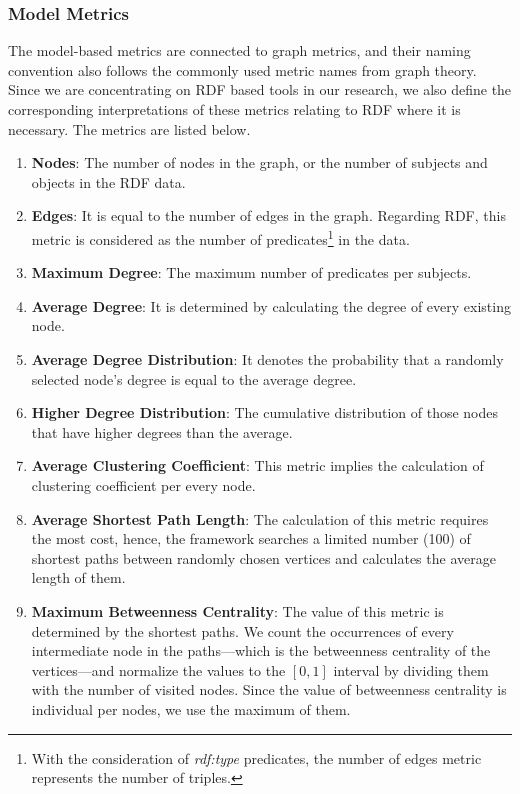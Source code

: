 \subsubsection{Model Metrics}
The model-based metrics are connected to graph metrics, and their naming convention also follows the commonly used metric names from graph theory. Since we are concentrating on RDF based tools in our research, we also define the corresponding interpretations of these metrics relating to RDF where it is necessary. The metrics are listed below.
\begin{enumerate}
	\item{\textbf{Nodes}}: The number of nodes in the graph, or the number of subjects and objects in the RDF data.
	\item{\textbf{Edges}}: It is equal to the number of edges in the graph. Regarding RDF, this metric is considered as the number of predicates\footnote{With the consideration of \textit{rdf:type} predicates, the number of edges metric represents the number of triples.} in the data.
	\item{\textbf{Maximum Degree}}: The maximum number of predicates per subjects.
	\item{\textbf{Average Degree}}: It is determined by calculating the degree of every existing node.
	\item{\textbf{Average Degree Distribution}}: It denotes the probability that a randomly selected node’s degree is equal to the average degree.
	\item{\textbf{Higher Degree Distribution}}: The cumulative distribution of those nodes that have higher degrees than the average.
	\item{\textbf{Average Clustering Coefficient}}: This metric implies the calculation of clustering coefficient per every node.
	\item{\textbf{Average Shortest Path Length}}: The calculation of this metric requires the most cost, hence, the framework searches a limited number (100) of shortest paths between randomly chosen vertices and calculates the average length of them.
	\item{\textbf{Maximum Betweenness Centrality}}: The value of this metric is determined by the shortest paths. We count the occurrences of every intermediate node in the paths---which is the betweenness centrality of the vertices---and normalize the values to the $[0,1]$ interval by dividing them with the number of visited nodes. Since the value of betweenness centrality is individual per nodes, we use the maximum of them.
\end{enumerate}

